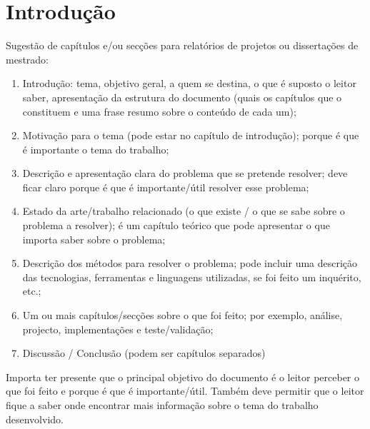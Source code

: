 \chapter{Introdução}
\label{intro}



Sugestão de capítulos e/ou secções para relatórios de projetos ou dissertações de mestrado:
\begin{enumerate}
    \item Introdução: tema, objetivo geral, a quem se destina, o que é suposto o leitor saber, apresentação da estrutura do documento (quais os capítulos que o constituem e uma frase resumo sobre o conteúdo de cada um);
    \item Motivação para o tema (pode estar no capítulo de introdução); porque é que é importante o tema do trabalho;
    \item Descrição e apresentação clara do problema que se pretende resolver; deve ficar claro porque é que é importante/útil resolver esse problema;
    \item Estado da arte/trabalho relacionado (o que existe / o que se sabe sobre o problema a resolver); é um capítulo teórico que pode apresentar o que importa saber sobre o problema; 
    \item  Descrição dos métodos para resolver o problema; pode incluir uma descrição das tecnologias, ferramentas e linguagens utilizadas, se foi feito um inquérito, etc.;
    \item Um ou mais capítulos/secções sobre o que foi feito; por exemplo, análise, projecto, implementações e teste/validação;
    \item Discussão / Conclusão (podem ser capítulos separados)
\end{enumerate}

Importa ter presente que o principal objetivo do documento é o leitor perceber o que foi feito e porque é que é importante/útil. Também deve permitir que o leitor fique a saber onde encontrar mais informação sobre o tema do trabalho desenvolvido.

